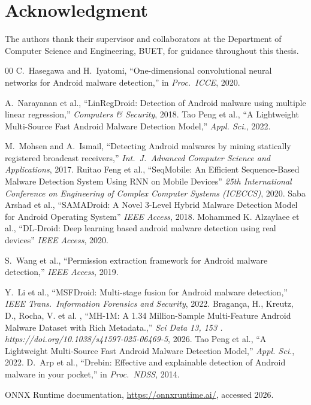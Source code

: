 \documentclass[conference]{IEEEtran}
\begin{document}
	\section*{Acknowledgment}
	The authors thank their supervisor and collaborators at the Department of Computer Science and Engineering, BUET, for guidance throughout this thesis.
	\begin{thebibliography}{00}
		C.~Hasegawa and H.~Iyatomi,
		``One-dimensional convolutional neural networks for Android malware detection,''
		in \textit{Proc.\ ICCE}, 2020.
		
		A.~Narayanan et al.,
		``LinRegDroid: Detection of Android malware using multiple linear regression,''
		\textit{Computers \& Security}, 2018.
		Tao Peng et al.,
		``A Lightweight Multi-Source Fast Android Malware Detection Model,''
		\textit{Appl.
			Sci.}, 2022.
		
		
		M.~Mohsen and A.~Ismail,
		``Detecting Android malwares by mining statically registered broadcast receivers,''
		\textit{Int.\ J.\ Advanced Computer Science and Applications}, 2017.
		Ruitao Feng et al.,
		``SeqMobile: An Efficient Sequence-Based Malware Detection System Using RNN on Mobile Devices''
		\textit{ 25th International Conference on Engineering of Complex Computer Systems (ICECCS)}, 2020.
		Saba Arshad et al.,
		``SAMADroid: A Novel 3-Level Hybrid Malware Detection Model for Android Operating System''
		\textit{IEEE Access}, 2018.
		Mohammed K. Alzaylaee et al.,
		``DL-Droid: Deep learning based android malware detection using real devices''
		\textit{IEEE Access}, 2020.
		
		S.~Wang et al.,
		``Permission extraction framework for Android malware detection,''
		\textit{IEEE Access}, 2019.
		
		Y.~Li et al.,
		``MSFDroid: Multi-stage fusion for Android malware detection,''
		\textit{IEEE Trans.\ Information Forensics and Security}, 2022.
		Bragança, H., 
		Kreutz, D., Rocha, V. et al. ,
		``MH-1M: A 1.34 Million-Sample Multi-Feature Android Malware Dataset with Rich Metadata.,''
		\textit{Sci Data 13, 153 .
			https://doi.org/10.1038/s41597-025-06469-5}, 2026.
		Tao Peng et al.,
		``A Lightweight Multi-Source Fast Android Malware Detection Model,''
		\textit{Appl.
			Sci.}, 2022.
		D.~Arp et al.,
		``Drebin: Effective and explainable detection of Android malware in your pocket,''
		in \textit{Proc.\ NDSS}, 2014.
		
		ONNX Runtime documentation,
		\url{https://onnxruntime.ai/}, accessed 2026.
	\end{thebibliography}
	
	
	
	
\end{document}
